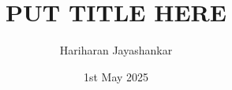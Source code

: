 \documentclass[handout,10pt,aspectratio=169]{beamer}
\title{PUT TITLE HERE}
\author{Hariharan Jayashankar}
\date{1st May 2025}
\begin{document}
\begin{frame}
  \titlepage
\end{frame}

    
\end{document}
